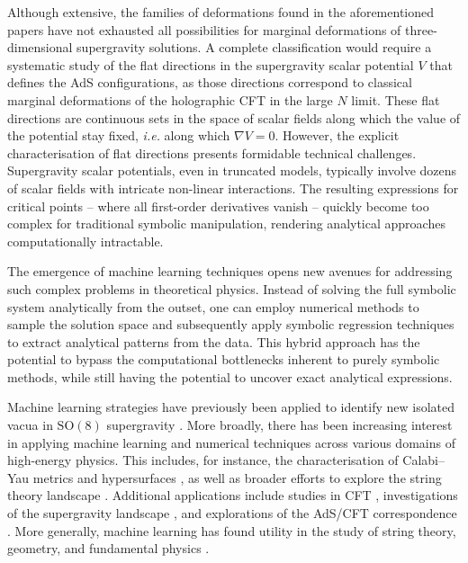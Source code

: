 \documentclass[11pt,a4paper]{article}
\begin{document}
Although extensive, the families of deformations found in the aforementioned papers have not exhausted all possibilities for marginal deformations of three-dimensional supergravity solutions. A complete classification would require a systematic study of the flat directions in the supergravity scalar potential $V$ that defines the AdS configurations, as those directions correspond to classical marginal deformations of the holographic CFT in the large $N$ limit. These flat directions are continuous sets in the space of scalar fields along which the value of the potential stay fixed, \textit{i.e.}  along which $\nabla V = 0$. However, the explicit characterisation of flat directions presents formidable technical challenges. Supergravity scalar potentials, even in truncated models, typically involve dozens of scalar fields with intricate non-linear interactions. The resulting expressions for critical points -- where all first-order derivatives vanish -- quickly become too complex for traditional symbolic manipulation, rendering analytical approaches computationally intractable.

The emergence of machine learning techniques opens new avenues for addressing such complex problems in theoretical physics. Instead of solving the full symbolic system analytically from the outset, one can employ numerical methods to sample the solution space and subsequently apply symbolic regression techniques to extract analytical patterns from the data. This hybrid approach has the potential to bypass the computational bottlenecks inherent to purely symbolic methods, while still having the potential to uncover exact analytical expressions.

Machine learning strategies have previously been applied to identify new isolated vacua in $\mathrm{SO}(8)$ supergravity \cite{Comsa:2019rcz,Berman:2022jqn}. More broadly, there has been increasing interest in applying machine learning and numerical techniques across various domains of high-energy physics. This includes, for instance, the characterisation of Calabi–Yau metrics and hypersurfaces \cite{Krefl:2017yox,Ashmore:2019wzb,Berman:2021mcw,Larfors:2022nep,Berglund:2022gvm,Jejjala:2020wcc,Douglas:2006rr,Larfors:2021pbb,He:2018jtw}, as well as broader efforts to explore the string theory landscape \cite{He:2017aed,Carifio:2017bov,Ruehle:2017mzq,Walden:2025cpf}. Additional applications include studies in CFT \cite{Chen:2020dxg}, investigations of the supergravity landscape \cite{Brady:2025zzi,Krishnan:2020sfg}, and explorations of the AdS/CFT correspondence \cite{Hashimoto:2018ftp}. More generally, machine learning has found utility in the study of string theory, geometry, and fundamental physics \cite{Ruehle:2020jrk,He:2023csq,Bao:2021auj}.
\end{document}
